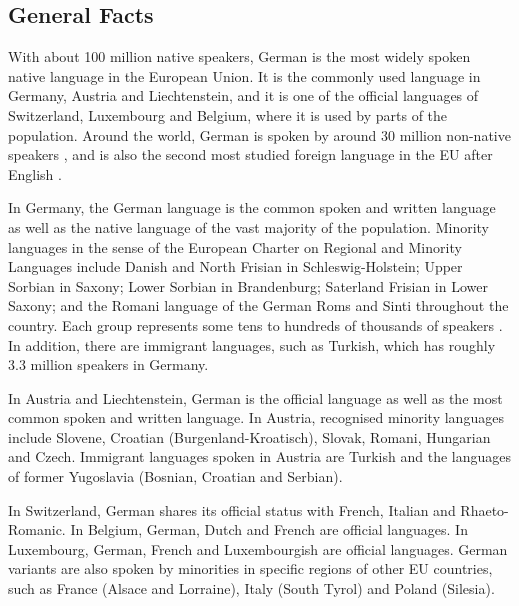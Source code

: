 \documentclass[]{../../metanetpaper}
\begin{document}
\clearpage


\begin{multicols}{2}

\subsection{General Facts}

With about 100 million native speakers, German is the most widely spoken native language in the European Union. It is the commonly used language in Germany, Austria and Liechtenstein, and it is one of the official languages of Switzerland, Luxembourg and Belgium, where it is used by parts of the population. Around the world, German is spoken by around 30 million non-native speakers \cite{Eur1}, and is also the second most studied foreign language in the EU after English \cite{Goe1}. 

In Germany, the German language is the common spoken and written language as well as the native language of the vast majority of the population. Minority languages in the sense of the European Charter on Regional and Minority Languages include Danish and North Frisian in Schleswig-Holstein; Upper Sorbian in Saxony; Lower Sorbian in Brandenburg; Saterland Frisian in Lower Saxony; and the Romani language of the German Roms and Sinti throughout the country. Each group represents some tens to hundreds of thousands of speakers \cite{Efni1}. In addition, there are immigrant languages, such as Turkish, which has roughly 3.3 million speakers in Germany.

In Austria and Liechtenstein, German is the official language as well as the most common spoken and written language. In Austria, recognised minority languages include Slovene, Croatian (Burgenland-Kroatisch), Slovak, Romani, Hungarian and Czech. Immigrant languages spoken in Austria are Turkish and the languages of former Yugoslavia (Bosnian, Croatian and Serbian).


In Switzerland, German shares its official status with French, Italian and Rhaeto-Romanic. In Belgium, German, Dutch and French are official languages. In Luxembourg, German, French and Luxembourgish are official languages. German variants are also spoken by minorities in specific regions of other EU countries, such as France (Alsace and Lorraine), Italy (South Tyrol) and Poland (Silesia).


\end{multicols}
\end{document}
